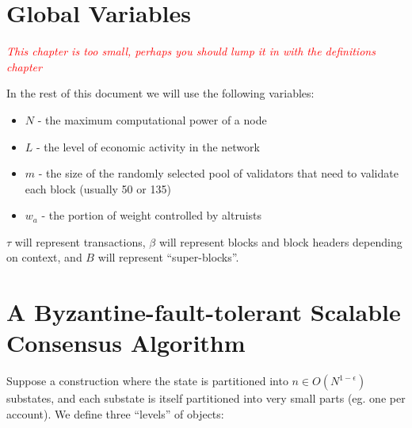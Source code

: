 \documentclass[11pt,a4paper]{report}
\newcommand{\comment}[1]{\textcolor{red}{\textit{#1}}}
\theoremstyle{plain}
\theoremstyle{definition}
\theoremstyle{remark}
\begin{document}
\chapter{Global Variables}

\comment{This chapter is too small, perhaps you should lump it in with the definitions chapter}

In the rest of this document we will use the following variables:

\begin{itemize}
\item
$N$ - the maximum computational power of a node
\item
$L$ - the level of economic activity in the network
\item
$m$ - the size of the randomly selected pool of validators that need to validate each block (usually 50 or 135)
\item
$w_a$ - the portion of weight controlled by altruists
\end{itemize}

$\tau$ will represent transactions, $\beta$ will represent blocks and block headers depending on context, and $B$ will represent ``super-blocks''.

\chapter{A Byzantine-fault-tolerant Scalable Consensus Algorithm}

Suppose a construction where the state is partitioned into $n \in O(N^{1-\epsilon})$ substates, and each substate is itself partitioned into very small parts (eg. one per account). We define three ``levels'' of objects:
\end{document}
